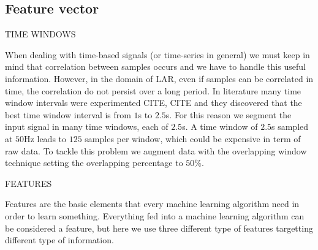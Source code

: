 \subsection{Feature vector}
\label{subsec:feature-vector}

TIME WINDOWS

When dealing with time-based signals (or time-series in general) we
must keep in mind that correlation between samples occurs and we have
to handle this useful information. However, in the domain of LAR, even
if samples can be correlated in time, the correlation do not persist
over a long period. In literature many time window intervals were
experimented CITE, CITE and they discovered that the best time window
interval is from $1$s to $2.5$s. For this reason we segment the input
signal in many time windows, each of $2.5$s. A time window of $2.5$s
sampled at $50$Hz leads to $125$ samples per window, which could be
expensive in term of raw data. To tackle this problem we augment
data with the overlapping window technique setting the overlapping
percentage to $50$\%.

FEATURES

Features are the basic elements that every machine learning algorithm
need in order to learn something. Everything fed into a machine
learning algorithm can be considered a feature, but here we use three different type of features targetting different type of information.

